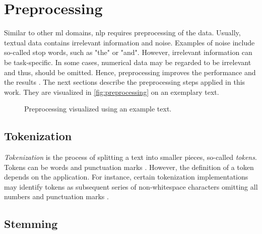\section{Preprocessing}\label{sec:preprocessing}

Similar to other \ac{ml} domains, \ac{nlp} requires preprocessing of the data.
Usually, textual data contains irrelevant information and noise.
Examples of noise include so-called stop words, such as "the" or "and".
However, irrelevant information can be task-specific. 
In some cases, numerical data may be regarded to be irrelevant and thus, should be omitted.
Hence, preprocessing improves the performance and the results \cite{clusteringDocs2020}.
The next sections describe the preprocessing steps applied in this work.
They are visualized in \autoref{fig:preprocessing} on an exemplary text.

\begin{figure}[!htb] %
    \centering
    
    \caption[Preprocessing]{Preprocessing visualized using an example text.}
    \label{fig:preprocessing}
\end{figure}


\subsection{Tokenization}\label{subsec:tokenization}

\textit{Tokenization} is the process of splitting a text into smaller pieces, so-called \textit{tokens}.
Tokens can be words and punctuation marks \cite{nlp-book2009}.
However, the definition of a token depends on the application.
For instance, certain tokenization implementations may identify tokens as subsequent series of non-whitespace characters omitting all numbers and punctuation marks \cite{IR2011}.


\subsection{Stemming}\label{subsec:stemming}


